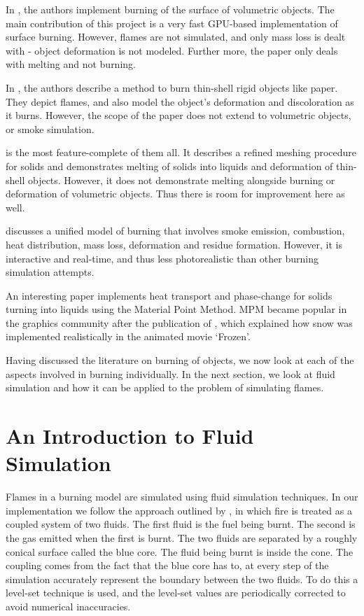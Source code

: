 \documentclass[12pt]{report}
\begin{document}
In \cite{jiyoai}, the authors implement burning of the surface of volumetric objects. The main contribution of this project is a very fast GPU-based implementation of surface burning. However, flames are not simulated, and only mass loss is dealt with - object deformation is not modeled. Further more, the paper only deals with melting and not burning.

In \cite{liliansu}, the authors describe a method to burn thin-shell rigid objects like paper. They depict flames, and also model the object's deformation and discoloration as it burns. However, the scope of the paper does not extend to volumetric objects, or smoke simulation.

\cite{loirgufe} is the most feature-complete of them all. It describes a refined meshing procedure for solids and demonstrates melting of solids into liquids and deformation of thin-shell objects. However, it does not demonstrate melting alongside burning or deformation of volumetric objects. Thus there is room for improvement here as well.

\cite{melek} discusses a unified model of burning that involves smoke emission, combustion, heat distribution, mass loss, deformation and residue formation. However, it is interactive and real-time, and thus less photorealistic than other burning simulation attempts.

An interesting paper \cite{stomahkin} implements heat transport and phase-change for solids turning into liquids using the Material Point Method. MPM became popular in the graphics community after the publication of \cite{snow}, which explained how snow was implemented realistically in the animated movie `Frozen'.


Having discussed the literature on burning of objects, we now look at each of the aspects involved in burning individually. In the next section, we look at fluid simulation and how it can be applied to the problem of simulating flames.

\chapter{An Introduction to Fluid Simulation}

Flames in a burning model are simulated using fluid simulation techniques. In our implementation we follow the approach outlined by \cite{ngfeje}, in which fire is treated as a coupled system of two fluids. The first fluid is the fuel being burnt. The second is the gas emitted when the first is burnt. The two fluids are separated by a roughly conical surface called the blue core. The fluid being burnt is inside the cone. The coupling comes from the fact that the blue core has to, at every step of the simulation accurately represent the boundary between the two fluids. To do this a level-set technique is used, and the level-set values are periodically corrected to avoid numerical inaccuracies.
\end{document}
